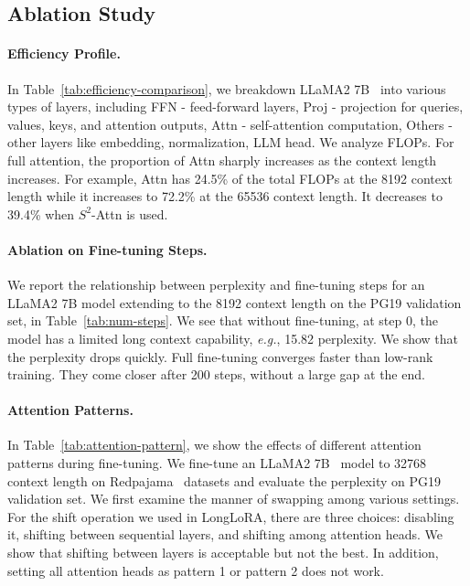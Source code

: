 \documentclass{article} %
\begin{document}
\subsection{Ablation Study}
\label{exp:ablation}
\paragraph{Efficiency Profile.}
In Table~\ref{tab:efficiency-comparison}, we breakdown LLaMA2 7B~\citep{llama2} into various types of layers, including FFN - feed-forward layers, Proj - projection for queries, values, keys, and attention outputs, Attn - self-attention computation, Others - other layers like embedding, normalization, LLM head. We analyze FLOPs. For full attention, the proportion of Attn sharply increases as the context length increases. For example, Attn has 24.5\% of the total FLOPs at the 8192 context length while it increases to 72.2\% at the 65536 context length. It decreases to 39.4\% when $S^2$-Attn is used.

\paragraph{Ablation on Fine-tuning Steps.}
We report the relationship between perplexity and fine-tuning steps for an LLaMA2 7B model extending to the 8192 context length on the PG19 validation set, in Table~\ref{tab:num-steps}. We see that without fine-tuning, at step 0, the model has a limited long context capability, \textit{e.g.}, 15.82 perplexity. We show that the perplexity drops quickly. Full fine-tuning converges faster than low-rank training. They come closer after 200 steps, without a large gap at the end.

\paragraph{Attention Patterns.}
In Table~\ref{tab:attention-pattern}, we show the effects of different attention patterns during fine-tuning. We fine-tune an LLaMA2 7B~\citep{llama2} model to 32768 context length on Redpajama~\citep{together2023redpajama} datasets and evaluate the perplexity on PG19~\citep{pg19} validation set. We first examine the manner of swapping among various settings. For the shift operation we used in LongLoRA, there are three choices: disabling it, shifting between sequential layers, and shifting among attention heads. We show that shifting between layers is acceptable but not the best. In addition, setting all attention heads as pattern 1 or pattern 2 does not work.
\end{document}
